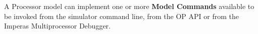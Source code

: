 A Processor model can implement one or more \textbf{Model Commands} available to be invoked from the
 simulator command line, from the OP API or from the Imperas Multiprocessor Debugger.

